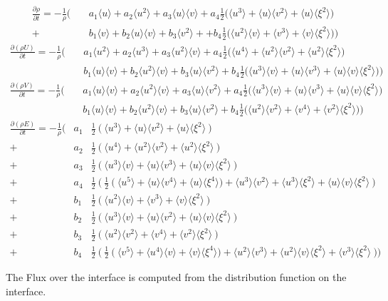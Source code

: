 \documentclass[
	pdftex,             %
	12pt,				%
	a4paper,		   	%
	german,				%
	oneside,			%
]{article}
\newcommand{\mom}[1]{\langle #1 \rangle}
\begin{document}
\begin{eqnarray*}
\frac{\partial \rho}{\partial t}
=
-\frac{1}{\rho}
\Bigg(
 &~&a_1 \mom{u} + a_2 \mom{u^2} + a_3 \mom{u}\mom{v}
+   a_4 \frac{1}{2} \Big( \mom{u^3} + \mom{u}\mom{v^2} + \mom{u}\mom{\xi^2} \Big)
\\
+&~&b_1 \mom{v} + b_2 \mom{u}\mom{v} + b_3 \mom{v^2} + 
+   b_4  \frac{1}{2} \Big( \mom{u^2}\mom{v} + \mom{v^3} + \mom{v}\mom{\xi^2} \Big)
\Bigg)
\end{eqnarray*}
\begin{eqnarray*}
\frac{\partial (\rho U)}{\partial t}
=
-\frac{1}{\rho}
\Bigg(
&~&a_1 \mom{u^2} + a_2 \mom{u^3} + a_3 \mom{u^2}\mom{v}
+  a_4 \frac{1}{2} \Big( \mom{u^4} + \mom{u^2}\mom{v^2} + \mom{u^2}\mom{\xi^2} \Big)
\\
&~&b_1 \mom{u}\mom{v} + b_2 \mom{u^2}\mom{v} + b_3 \mom{u}\mom{v^2}
+  b_4 \frac{1}{2} \Big( \mom{u^3}\mom{v} + \mom{u}\mom{v^3} + \mom{u}\mom{v}\mom{\xi^2} \Big)
\Bigg)
\end{eqnarray*}
\begin{eqnarray*}
\frac{\partial (\rho V)}{\partial t}
=
-\frac{1}{\rho}
\Bigg(
&~&a_1 \mom{u}\mom{v} + a_2 \mom{u^2}\mom{v} + a_3 \mom{u}\mom{v^2}
+  a_4 \frac{1}{2} \Big( \mom{u^3}\mom{v} + \mom{u}\mom{v^3} + \mom{u}\mom{v}\mom{\xi^2} \Big)
\\
&~&b_1 \mom{u}\mom{v} + b_2 \mom{u^2}\mom{v} + b_3 \mom{u}\mom{v^2}
+  b_4 \frac{1}{2} \Big( \mom{u^2}\mom{v^2} + \mom{v^4} + \mom{v^2}\mom{\xi^2} \Big)
\Bigg)
\end{eqnarray*}
\begin{eqnarray*}
\frac{\partial (\rho E)}{\partial t}
=
-\frac{1}{\rho}
\Bigg(
 &a_1& \frac{1}{2}~ \Big(~ \mom{u^3} + \mom{u}\mom{v^2} + \mom{u}\mom{\xi^2} ~\Big) \\
+&a_2& \frac{1}{2}~ \Big(~ \mom{u^4} + \mom{u^2}\mom{v^2} + \mom{u^2}\mom{\xi^2} ~\Big) \\
+&a_3& \frac{1}{2}~ \Big(~ \mom{u^3}\mom{v} + \mom{u}\mom{v^3} + \mom{u}\mom{v}\mom{\xi^2} ~\Big) \\
+&a_4& \frac{1}{2}~ \Big(~ \frac{1}{2}~
					\big(~ \mom{u^5} + \mom{u}\mom{v^4} + \mom{u}\mom{\xi^4} \big)
						 + \mom{u^3}\mom{v^2} + \mom{u^3}\mom{\xi^2} + \mom{u}\mom{v}\mom{\xi^2}
					~\Big)
\\
+&b_1& \frac{1}{2}~ \Big(~ \mom{u^2}\mom{v} + \mom{v^3} + \mom{v}\mom{\xi^2} ~\Big) \\
+&b_2& \frac{1}{2}~ \Big(~ \mom{u^3}\mom{v} + \mom{u}\mom{v^2} + \mom{u}\mom{v}\mom{\xi^2} ~\Big) \\
+&b_3& \frac{1}{2}~ \Big(~ \mom{u^2}\mom{v^2} + \mom{v^4} + \mom{v^2}\mom{\xi^2} ~\Big) \\
+&b_4& \frac{1}{2}~ \Big(~ \frac{1}{2}~
					\big(~ \mom{v^5} + \mom{u^4}\mom{v} + \mom{v}\mom{\xi^4} \big)
						 + \mom{u^2}\mom{v^3} + \mom{u^2}\mom{v}\mom{\xi^2} + \mom{v^3}\mom{\xi^2}
					~\Big)
\Bigg)
\end{eqnarray*}

The Flux over the interface is computed from the distribution function on the interface. 
\end{document}
